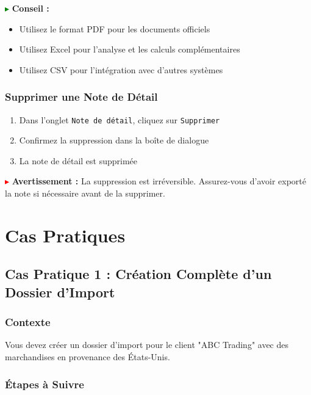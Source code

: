 \documentclass[12pt,a4paper]{report}
\begin{document}
\textcolor{green}{$\blacktriangleright$} \textbf{Conseil :} 
\begin{itemize}[leftmargin=*]
    \item Utilisez le format PDF pour les documents officiels
    \item Utilisez Excel pour l'analyse et les calculs complémentaires
    \item Utilisez CSV pour l'intégration avec d'autres systèmes
\end{itemize}

\subsection{Supprimer une Note de Détail}

\begin{enumerate}[leftmargin=*]
    \item Dans l'onglet \texttt{Note de détail}, cliquez sur \texttt{Supprimer}
    \item Confirmez la suppression dans la boîte de dialogue
    \item La note de détail est supprimée
\end{enumerate}

\textcolor{red}{$\blacktriangleright$} \textbf{Avertissement :} La suppression est irréversible. Assurez-vous d'avoir exporté la note si nécessaire avant de la supprimer.

\chapter{Cas Pratiques}

\section{Cas Pratique 1 : Création Complète d'un Dossier d'Import}

\subsection{Contexte}

Vous devez créer un dossier d'import pour le client "ABC Trading" avec des marchandises en provenance des États-Unis.

\subsection{Étapes à Suivre}
\end{document}
